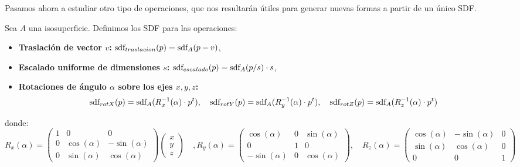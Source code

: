 Pasamos ahora a estudiar otro tipo de operaciones, que nos resultarán útiles para generar nuevas formas a partir de un único SDF. 

\begin{proposicion}\label{p:afines}
    Sea $A$ una isosuperficie. Definimos los SDF para las operaciones:
    \begin{itemize}
        \item \textbf{Traslación de vector $v$: } $\text{sdf}_{traslacion}(p) = \text{sdf}_{A}(p - v)$,
        \item \textbf{Escalado uniforme de dimensiones $s$: } $\text{sdf}_{escalado}(p) = \text{sdf}_{A}(p/s)\cdot s$,
        \item \textbf{Rotaciones de ángulo $\alpha$ sobre los ejes $x,y,z$: }
        \begin{equation*}
            \text{sdf}_{rotX}(p) = \text{sdf}_{A}(R_x^{-1}(\alpha)\cdot p^t),\quad \text{sdf}_{rotY}(p) = \text{sdf}_{A}(R_y^{-1}(\alpha)\cdot p^t),\quad \text{sdf}_{rotZ}(p) = \text{sdf}_{A}(R_z^{-1}(\alpha)\cdot p^t)
        \end{equation*}
    \end{itemize}
    donde:
    \begin{equation*}
        R_x(\alpha) = \begin{pmatrix}
            1&0&0\\
            0&\cos(\alpha) & -\sin(\alpha) \\
            0&\sin(\alpha) & \cos(\alpha) 
            \end{pmatrix}\begin{pmatrix}
            x \\
            y \\
            z
            \end{pmatrix}
        \quad,
        R_y(\alpha) = \begin{pmatrix}
            \cos(\alpha) &0& \sin(\alpha)\\
            0&1&0\\
            -\sin(\alpha) &0& \cos(\alpha) 
            \end{pmatrix},
        \quad
        R_z(\alpha) = \begin{pmatrix}
            \cos(\alpha) & -\sin(\alpha) & 0\\
            \sin(\alpha) & \cos(\alpha) & 0\\
            0&0&1
            \end{pmatrix}
    \end{equation*}
\end{proposicion}
